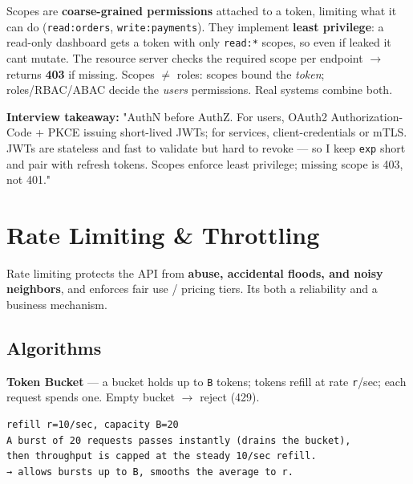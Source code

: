 \documentclass[11pt]{article}
\begin{document}
Scopes are \textbf{coarse-grained permissions} attached to a token, limiting what it can do (\texttt{read:orders}, \texttt{write:payments}). They implement \textbf{least privilege}: a read-only dashboard gets a token with only \texttt{read:*} scopes, so even if leaked it can\textquotesingle t mutate. The resource server checks the required scope per endpoint \(\rightarrow\) returns \textbf{403} if missing. Scopes \(\neq\) roles: scopes bound the \emph{token}; roles/RBAC/ABAC decide the \emph{user\textquotesingle s} permissions. Real systems combine both.

\textbf{Interview takeaway:} "AuthN before AuthZ. For users, OAuth2 Authorization-Code + PKCE issuing short-lived JWTs; for services, client-credentials or mTLS. JWTs are stateless and fast to validate but hard to revoke --- so I keep \texttt{exp} short and pair with refresh tokens. Scopes enforce least privilege; missing scope is 403, not 401."

\section{Rate Limiting \& Throttling}\label{rate-limiting--throttling}

Rate limiting protects the API from \textbf{abuse, accidental floods, and noisy neighbors}, and enforces fair use / pricing tiers. It\textquotesingle s both a reliability and a business mechanism.

\subsection{Algorithms}\label{algorithms}

\textbf{Token Bucket} --- a bucket holds up to \texttt{B} tokens; tokens refill at rate \texttt{r}/sec; each request spends one. Empty bucket \(\rightarrow\) reject (429).

\setcodelang{}

\begin{verbatim}
refill r=10/sec, capacity B=20
A burst of 20 requests passes instantly (drains the bucket),
then throughput is capped at the steady 10/sec refill.
→ allows bursts up to B, smooths the average to r.
\end{verbatim}

\end{document}
